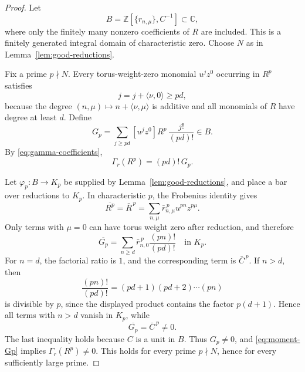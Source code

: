 \documentclass[11pt]{article}
\numberwithin{equation}{section}
\theoremstyle{definition}
\theoremstyle{remark}
\newcommand{\C}{\mathbb C}
\newcommand{\Z}{\mathbb Z}
\begin{document}
\begin{proof}
Let
\begin{equation}\label{eq:coefficient-ring}
  B=\Z[\{r_{n,\mu}\},C^{-1}]\subset\C,
\end{equation}
where only the finitely many nonzero coefficients of $R$ are included.  This
is a finitely generated integral domain of characteristic zero.  Choose $N$
as in Lemma~\ref{lem:good-reductions}.

Fix a prime $p\nmid N$.  Every torus-weight-zero monomial $u^jz^0$ occurring
in $R^p$ satisfies
\[
  j=j+\langle\nu,0\rangle\ge pd,
\]
because the degree $(n,\mu)\mapsto n+\langle\nu,\mu\rangle$ is additive and
all monomials of $R$ have degree at least $d$.  Define
\begin{equation}\label{eq:Gp-def}
  G_p=
  \sum_{j\ge pd}[u^jz^0]R^p\,\frac{j!}{(pd)!}\in B.
\end{equation}
By \eqref{eq:gamma-coefficients},
\begin{equation}\label{eq:moment-Gp}
  \Gamma_r(R^p)=(pd)!\,G_p.
\end{equation}

Let $\varphi_p:B\to K_p$ be supplied by
Lemma~\ref{lem:good-reductions}, and place a bar over reductions to $K_p$.
In characteristic $p$, the Frobenius identity gives
\begin{equation}\label{eq:frobenius}
  \overline{R^p}=\bar R^{\,p}
  =\sum_{n,\mu}\bar r_{n,\mu}^{\,p}u^{pn}z^{p\mu}.
\end{equation}
Only terms with $\mu=0$ can have torus weight zero after reduction, and
therefore
\begin{equation}\label{eq:Gp-reduction}
  \overline{G_p}
  =\sum_{n\ge d}\bar r_{n,0}^{\,p}
    \frac{(pn)!}{(pd)!}
  \quad\text{in }K_p.
\end{equation}
For $n=d$, the factorial ratio is $1$, and the corresponding term is
$\bar C^{\,p}$.  If $n>d$, then
\[
  \frac{(pn)!}{(pd)!}
  =(pd+1)(pd+2)\cdots(pn)
\]
is divisible by $p$, since the displayed product contains the factor
$p(d+1)$.  Hence all terms with $n>d$ vanish in $K_p$, while
\begin{equation}\label{eq:Gp-isolated}
  \overline{G_p}=\bar C^{\,p}\ne0.
\end{equation}
The last inequality holds because $C$ is a unit in $B$.  Thus $G_p\ne0$,
and \eqref{eq:moment-Gp} implies $\Gamma_r(R^p)\ne0$.  This holds for every
prime $p\nmid N$, hence for every sufficiently large prime.
\end{proof}
\end{document}
